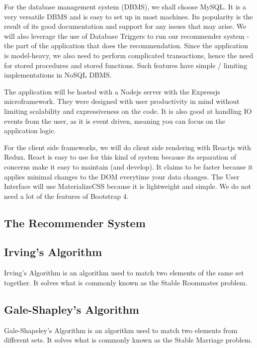 \documentclass[journal]{./IEEE/IEEEtran}
\begin{document}
For the database management system (DBMS), we shall choose MySQL. It is a very versatile DBMS and is easy to set up in most machines. Its popularity is the result of its good documentation and support for any issues that may arise. We will also leverage the use of Database Triggers to run our recommender system - the part of the application that does the recommendation. Since the application is model-heavy, we also need to perform complicated transactions, hence the need for stored procedures and stored functions. Such features have simple / limiting implementations in NoSQL DBMS.

The application will be hosted with a Nodejs server with the Expressjs microframework. They were designed with user productivity in mind without limiting scalability and expressiveness on the code. It is also good at handling IO events from the user, as it is event driven, meaning you can focus on the application logic.

For the client side frameworks, we will do client side rendering with Reactjs with Redux. React is easy to use for this kind of system because its separation of concerns make it easy to maintain (and develop). It claims to be faster because it applies minimal changes to the DOM everytime your data changes. The User Interface will use MaterializeCSS because it is lightweight and simple. We do not need a lot of the features of Bootstrap 4.

\subsection{The Recommender System}

\subsection{Irving's Algorithm}
Irving's Algorithm is an algorithm used to match two elements of the same set together. It solves what is commonly known as the Stable Roommates problem.

\subsection{Gale-Shapley's Algorithm}
Gale-Shapeley's Algorithm is an algorithm used to match two elements from different sets. It solves what is commonly known as the Stable Marriage problem.

\end{document}
